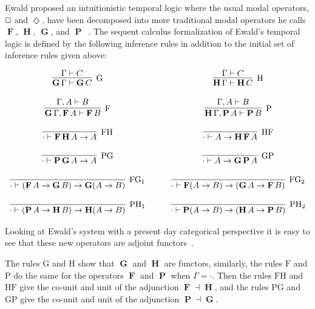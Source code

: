 \documentclass{article}
\renewcommand{\Box}{\oblong}
\newcommand{\F}{\mathop{\textbf{F}}}
\renewcommand{\P}{\mathop{\textbf{P}}}
\newcommand{\G}{\mathop{\textbf{G}}}
\renewcommand{\H}{\mathop{\textbf{H}}}
\begin{document}
Ewald proposed an intuitionistic temporal logic where the usual modal operators, $\Box$ and $\Diamond$, have been decomposed into more
traditional modal operators he calls $\F$, $\H$, $\G$, and $\P$~\cite{ewald1986}.  The sequent calculus formalization of Ewald's
temporal logic is defined by the following inference rules in addition
to the initial set of inference rules given above:
\begin{center}
  \small
  \begin{math}
    \begin{array}{cccccc}
      \infer[\text{G}]{\G \Gamma \vdash \G C}{
        \Gamma \vdash C
      }
      & \quad &
      \infer[\text{H}]{\H\Gamma \vdash \H C}{
        \Gamma \vdash C
      }\\\\
      \infer[\text{F}]{\G\Gamma,\F A \vdash \F B}{
        \Gamma,A \vdash B
      }
      & \quad &
      \infer[\text{P}]{\H\Gamma,\P A \vdash \P B}{
        \Gamma,A \vdash B
      }\\\\
      \infer[\text{FH}]{\cdot \vdash \F\H A \to A}{
        \,
      }
      & \quad &
      \infer[\text{HF}]{\cdot \vdash A \to \H\F A}{
        \,
      }\\\\
      \infer[\text{PG}]{\cdot \vdash \P\G A \to A}{
        \,
      }
      & \quad &
      \infer[\text{GP}]{\cdot \vdash A \to \G\P A}{
        \,
      }\\\\
      \infer[\text{FG}_1]{\cdot \vdash (\F A \to \G B) \to \G(A \to B)}{
        \,
      }
      & \quad &
      \infer[\text{FG}_2]{\cdot \vdash \F(A \to B) \to (\G A \to \F B)}{
        \,
      }\\\\
      \infer[\text{PH}_1]{\cdot \vdash (\P A \to \H B) \to \H(A \to B)}{
        \,
      }
      & \quad &
      \infer[\text{PH}_2]{\cdot \vdash \P(A \to B) \to (\H A \to \P B)}{
        \,
      }      
    \end{array}
  \end{math}
\end{center}
Looking at Ewald's system  with a present day categorical perspective it is easy to see that these new operators are adjoint functors~\cite{Menni:2014}.  

The rules $\text{G}$ and $\text{H}$ show that $\G$
and $\H$ are functors, similarly, the rules $\text{F}$ and $\text{P}$
do the same for the operators $\F$ and $\P$ when $\Gamma = \cdot$.
Then the rules $\text{FH}$ and $\text{HF}$ give the co-unit and unit
of the adjunction $\F \dashv \H$, and the rules $\text{PG}$ and
$\text{GP}$ give the co-unit and unit of the adjunction $\P \dashv
\G$.
\end{document}
